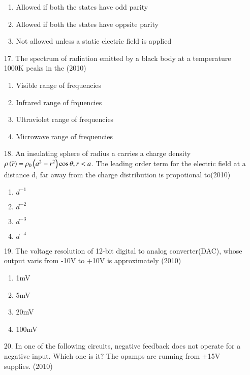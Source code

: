 \documentclass[journal]{IEEEtran}
\begin{document}
\begin{enumerate}
\begin{enumerate}[label=(\Alph*)]
        \item Allowed if both the states have odd parity
        \item Allowed if both the states have oppsite parity
        \item Not allowed unless a static electric field is applied
    \end{enumerate}
    \item[17.] The spectrum of radiation emitted by a black body at a temperature 1000K peaks in the \hfill (2010)
    \begin{enumerate}[label=(\Alph*)]
        \item Visible range of frequencies 
        \item Infrared range of frquencies 
        \item Ultraviolet range of frequencies
        \item Microwave range of frequencies
    \end{enumerate}
    \item[18.] An insulating sphere of radius a carries a charge density $\rho \left(\bar{r}\right)=\rho_0\left(a^2-r^2\right)\cos\theta; r<a$. The leading order term for the electric field at a distance d, far away from the charge distribution is propotional to\hfill (2010)
    \begin{enumerate}[label=(\Alph*)]
        \item $d^{-1}$
        \item $d^{-2}$
        \item $d^{-3}$
        \item $d^{-4}$
    \end{enumerate}
    \item[19.] The voltage resolution of 12-bit digital to analog converter(DAC), whose output varis from -10V to +10V is approximately  \hfill (2010)
    \begin{enumerate}[label=(\Alph*)]
        \item 1mV
        \item 5mV
        \item 20mV
        \item 100mV
    \end{enumerate}
    \item[20.] In one of the following circuits, negative feedback does not operate for a negative input. Which one is it? The opamps are running from $\pm$15V supplies. \hfill (2010)
    \begin{figure}[!ht]
        \centering
        \resizebox{0.3\textwidth}{!}{%
}
\end{figure}
\end{enumerate}
\end{document}
